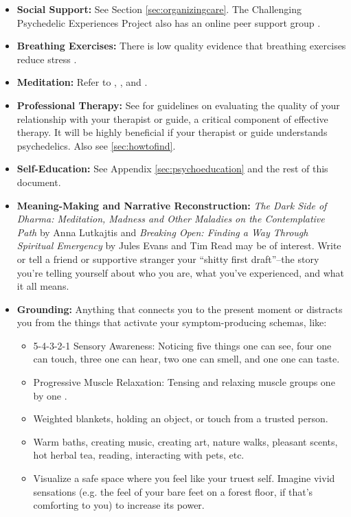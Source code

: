\documentclass[12pt,letterpaper]{book}
\begin{document}
\begin{itemize}
    \item \textbf{Social Support:} See Section \ref{sec:organizingcare}. The Challenging Psychedelic Experiences Project also has an online peer support group \cite{peersupportgroup}.
    \item \textbf{Breathing Exercises:} There is low quality evidence that breathing exercises reduce stress \cite{fincham2023breathwork}.
    \item \textbf{Meditation:} Refer to \textcite{rain}, \textcite{bodyscan}, and \textcite{lkMeditation}.
    \item \textbf{Professional Therapy:} See \textcite{BRWAIdownload} for guidelines on evaluating the quality of your relationship with your therapist or guide, a critical component of effective therapy. It will be highly beneficial if your therapist or guide understands psychedelics. Also see \ref{sec:howtofind}.
    \item \textbf{Self-Education:} See Appendix \ref{sec:psychoeducation} and the rest of this document.
    \item \textbf{Meaning-Making and Narrative Reconstruction:} \textit{The Dark Side of Dharma: Meditation, Madness and Other Maladies on the Contemplative Path} by Anna Lutkajtis \cite{lutkajtis2021dark} and \textit{Breaking Open: Finding a Way Through Spiritual Emergency} by Jules Evans and Tim Read \cite{evans2020} may be of interest. Write or tell a friend or supportive stranger your “shitty first draft”–the story you're telling yourself about who you are, what you've experienced, and what it all means.
    \item \textbf{Grounding:} Anything that connects you to the present moment or distracts you from the things that activate your symptom-producing schemas, like:
    \begin{itemize}
        \item 5-4-3-2-1 Sensory Awareness: Noticing five things one can see, four one can touch, three one can hear, two one can smell, and one one can taste.
        \item Progressive Muscle Relaxation: Tensing and relaxing muscle groups one by one \cite{michiganProgressive}.
        \item Weighted blankets, holding an object, or touch from a trusted person.
        \item Warm baths, creating music, creating art, nature walks, pleasant scents, hot herbal tea, reading, interacting with pets, etc.
        \item Visualize a safe space where you feel like your truest self. Imagine vivid sensations (e.g. the feel of your bare feet on a forest floor, if that's comforting to you) to increase its power.

\end{itemize}
\end{itemize}
\end{document}
